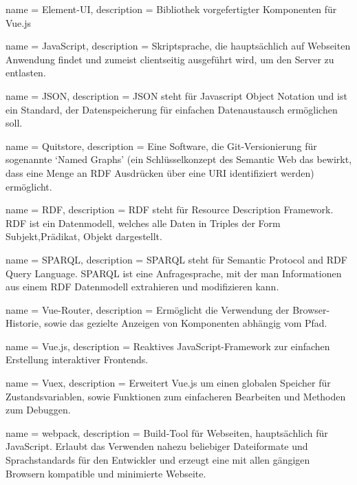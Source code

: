  {
    name = Element-UI,
    description = {
        Bibliothek vorgefertigter Komponenten für Vue.js
    }
}

 {
    name = JavaScript,
    description = {
        Skriptsprache, die hauptsächlich auf Webseiten Anwendung findet und zumeist clientseitig ausgeführt wird, um den Server zu entlasten.
    }
}

 {
    name = JSON,
    description = {
        JSON steht für Javascript Object Notation und ist ein Standard, der Datenspeicherung für einfachen Datenaustausch ermöglichen soll.
    }
}

 {
    name = Quitstore,
    description = {
        Eine Software, die Git-Versionierung für sogenannte `Named Graphs' (ein Schlüsselkonzept des Semantic Web das bewirkt, dass eine Menge an RDF Ausdrücken über eine URI identifiziert werden) ermöglicht.
    }
}

 {
    name = RDF,
    description = {
        RDF steht für Resource Description Framework. RDF ist ein Datenmodell, welches alle Daten in Triples der Form Subjekt,Prädikat, Objekt dargestellt.
    }
}

 {
    name = SPARQL,
    description = {
        SPARQL steht für Semantic Protocol and RDF Query Language. SPARQL ist eine Anfragesprache, mit der man Informationen aus einem RDF Datenmodell extrahieren und modifizieren kann.
    }
}

 {
    name = Vue-Router,
    description = {
        Ermöglicht die Verwendung der Browser-Historie, sowie das gezielte Anzeigen von Komponenten abhängig vom Pfad.
    }
}

 {
    name = Vue.js,
    description = {
        Reaktives JavaScript-Framework zur einfachen Erstellung interaktiver Frontends.
    }
}

 {
    name = Vuex,
    description = {
        Erweitert Vue.js um einen globalen Speicher für Zustandsvariablen, sowie Funktionen zum einfacheren Bearbeiten und Methoden zum Debuggen.
    }
}

 {
    name = webpack,
    description = {
        Build-Tool für Webseiten, hauptsächlich für JavaScript. Erlaubt das Verwenden nahezu beliebiger Dateiformate und Sprachstandards für den Entwickler und erzeugt eine mit allen gängigen Browsern kompatible und minimierte Webseite.
    }
}
